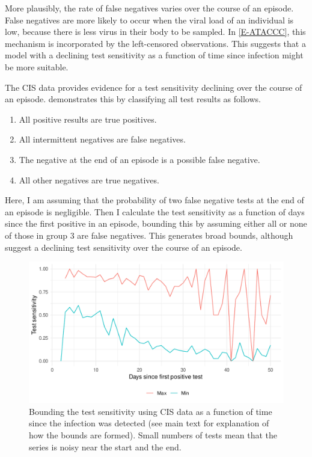 \documentclass[thesis.tex]{subfiles}
\begin{document}
More plausibly, the rate of false negatives varies over the course of an episode.
False negatives are more likely to occur when the viral load of an individual is low, because there is less virus in their body to be sampled.
In \cref{E-ATACCC}, this mechanism is incorporated by the left-censored observations.
This suggests that a model with a declining test sensitivity as a function of time since infection might be more suitable.

The CIS data provides evidence for a test sensitivity declining over the course of an episode.
 demonstrates this by classifying all test results as follows.
\begin{enumerate}
    \item All positive results are true positives.
    \item All intermittent negatives are false negatives.
    \item The negative at the end of an episode is a possible false negative.
    \item All other negatives are true negatives.
\end{enumerate}
Here, I am assuming that the probability of two false negative tests at the end of an episode is negligible.
Then I calculate the test sensitivity as a function of days since the first positive in an episode, bounding this by assuming either all or none of those in group 3 are false negatives.
This generates broad bounds, although suggest a declining test sensitivity over the course of an episode.
\begin{figure}
  \includegraphics{cis-imperfect-testing/test-sens-bound}
  \caption[Bounding test sensitivity using CIS data]{
    Bounding the test sensitivity using CIS data as a function of time since the infection was detected (see main text for explanation of how the bounds are formed).
    Small numbers of tests mean that the series is noisy near the start and the end.
  }
  \label{imperf-test:fig:bounding-cis-sensitivity}
\end{figure}
\end{document}

